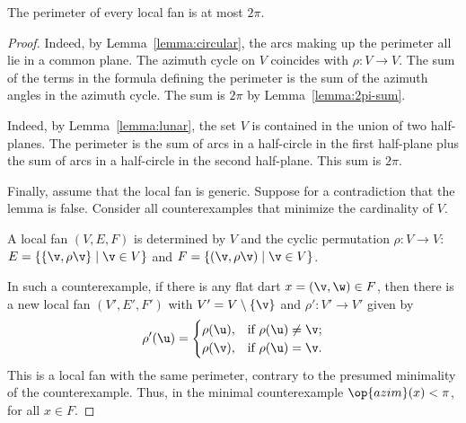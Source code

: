 \begin{lemma}[]
The perimeter of every local fan is at most $2\pi$.  
\end{lemma}
%
%

\begin{proof} 
  Indeed, by Lemma~\ref{lemma:circular},
the arcs making up the perimeter all lie in a common plane.  The
azimuth cycle on $V$ coincides with $\rho:V\to V$.  The sum of the
terms in the formula defining the perimeter is the sum of the
azimuth angles in the azimuth cycle.  The sum is $2\pi$ by
Lemma~\ref{lemma:2pi-sum}.


  Indeed, by Lemma~\ref{lemma:lunar}, the
set $V$ is contained in the union of two half-planes.  The perimeter
is the sum of arcs in a half-circle in the first half-plane plus the
sum of arcs in a half-circle in the second half-plane. This sum is
$2\pi$.

Finally, assume that the local fan is generic.  Suppose for a
contradiction that the lemma is false.  Consider all counterexamples
that minimize the cardinality of $V$.  

A local fan $(V,E,F)$ is determined by $V$ and the cyclic
permutation $\rho:V\to V$: $E=\{\{\v,\rho \v\}\mid \v\in V\}$ and $F
= \{(\v,\rho \v)\mid \v\in V\}$.

In such a counterexample, if there is any flat dart
$x=(\v,\w)\in F$, then there is a new local
fan $(V',E',F')$ with $V' = V\setminus\{\v\}$ and $\rho':V'\to V'$
given by
\begin{displaymath}
\rho'(\u) = \begin{cases}
\rho(\u), & \text{if } \rho(\u)\ne \v;\\
\rho(\v), & \text{if }\rho(\u) = \v.\\
\end{cases}
\end{displaymath}
This is a local fan with the same perimeter, contrary to the presumed
minimality of the counterexample.  Thus, in the minimal counterexample
$\op{azim}(x) <\pi$, for all $x\in F$.


\end{proof}
